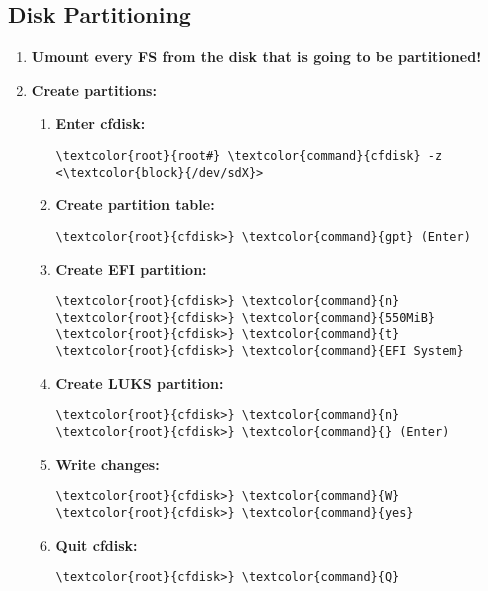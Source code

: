 \documentclass[10pt, a4paper, onecolumn, oneside, titlepage, openany]{book}
\begin{document}
\subsection{Disk Partitioning}
\begin{enumerate}
    \item \textbf{Umount every FS from the disk that is going to be partitioned!}
    \item \textbf{Create partitions:}
    \begin{enumerate}
        \item \textbf{Enter cfdisk:}
\begin{Verbatim}[commandchars=\\\{\}]
\textcolor{root}{root#} \textcolor{command}{cfdisk} -z <\textcolor{block}{/dev/sdX}>
\end{Verbatim}
        \item \textbf{Create partition table:}
\begin{Verbatim}[commandchars=\\\{\}]
\textcolor{root}{cfdisk>} \textcolor{command}{gpt} (Enter)
\end{Verbatim}
        \item \textbf{Create EFI partition:}
\begin{Verbatim}[commandchars=\\\{\}]
\textcolor{root}{cfdisk>} \textcolor{command}{n}
\textcolor{root}{cfdisk>} \textcolor{command}{550MiB}
\textcolor{root}{cfdisk>} \textcolor{command}{t}
\textcolor{root}{cfdisk>} \textcolor{command}{EFI System}
\end{Verbatim}
        \item \textbf{Create LUKS partition:}
\begin{Verbatim}[commandchars=\\\{\}]
\textcolor{root}{cfdisk>} \textcolor{command}{n}
\textcolor{root}{cfdisk>} \textcolor{command}{} (Enter)
\end{Verbatim}
        \item \textbf{Write changes:}
\begin{Verbatim}[commandchars=\\\{\}]
\textcolor{root}{cfdisk>} \textcolor{command}{W}
\textcolor{root}{cfdisk>} \textcolor{command}{yes}
\end{Verbatim}
        \item \textbf{Quit cfdisk:}
\begin{Verbatim}[commandchars=\\\{\}]
\textcolor{root}{cfdisk>} \textcolor{command}{Q}
\end{Verbatim}

\end{enumerate}
\end{enumerate}
\end{document}
